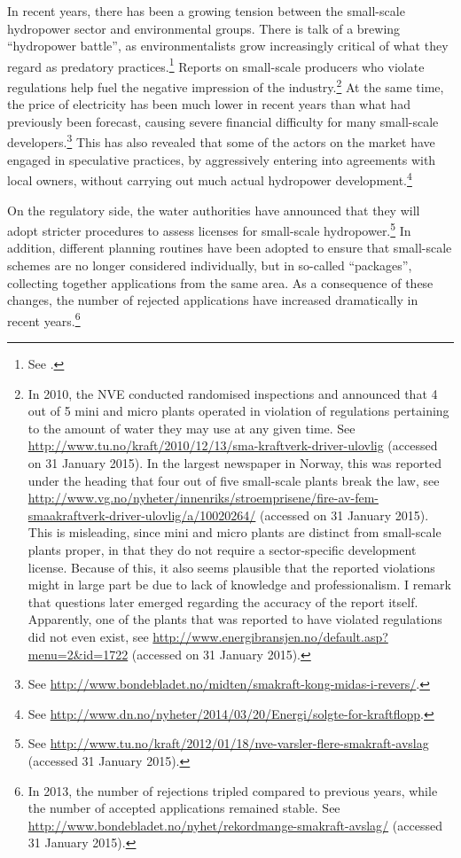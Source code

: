 In recent years, there has been a growing tension between the small-scale hydropower sector and environmental groups. There is talk of a brewing ``hydropower battle'', as environmentalists grow increasingly critical of what they regard as predatory practices.\footnote{See \cite{haltbrekken12}.}
Reports on small-scale producers who violate regulations help fuel the negative impression of the industry.\footnote{In 2010, the NVE conducted randomised inspections and announced that 4 out of 5 mini and micro plants operated in violation of regulations pertaining to the amount of water they may use at any given time. See \url{http://www.tu.no/kraft/2010/12/13/sma-kraftverk-driver-ulovlig} (accessed on 31 January 2015). In the largest newspaper in Norway, this was reported under the heading that four out of five small-scale plants break the law, see \url{http://www.vg.no/nyheter/innenriks/stroemprisene/fire-av-fem-smaakraftverk-driver-ulovlig/a/10020264/} (accessed on 31 January 2015). This is misleading, since mini and micro plants are distinct from small-scale plants proper, in that they do not require a sector-specific development license. Because of this, it also seems plausible that the reported violations might in large part be due to lack of knowledge and professionalism. I remark that questions later emerged regarding the accuracy of the report itself. Apparently, one of the plants that was reported to have violated regulations did not even exist, see \url{http://www.energibransjen.no/default.asp?menu=2&id=1722} (accessed on 31 January 2015).} At the same time, the price of electricity has been much lower in recent years than what had previously been forecast, causing severe financial difficulty for many small-scale developers.\footnote{See \url{http://www.bondebladet.no/midten/smakraft-kong-midas-i-revers/}.} This has also revealed that some of the actors on the market have engaged in speculative practices, by aggressively entering into agreements with local owners, without carrying out much actual hydropower development.\footnote{See \url{http://www.dn.no/nyheter/2014/03/20/Energi/solgte-for-kraftflopp}.}

On the regulatory side, the water authorities have announced that they will adopt stricter procedures to assess licenses for small-scale hydropower.\footnote{See \url{http://www.tu.no/kraft/2012/01/18/nve-varsler-flere-smakraft-avslag} (accessed 31 January 2015).} In addition, different planning routines have been adopted to ensure that small-scale schemes are no longer considered individually, but in so-called ``packages'', collecting together applications from the same area. As a consequence of these changes, the number of rejected applications have increased dramatically in recent years.\footnote{In 2013, the number of rejections tripled compared to previous years, while the number of accepted applications remained stable. See \url{http://www.bondebladet.no/nyhet/rekordmange-smakraft-avslag/} (accessed 31 January 2015).}


